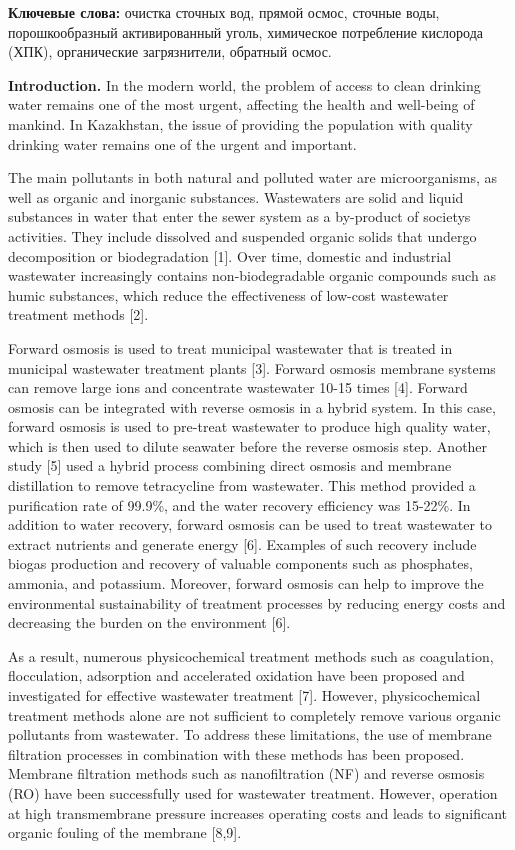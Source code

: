 {\bfseries Ключевые слова:} очистка сточных вод, прямой осмос, сточные
воды, порошкообразный активированный уголь, химическое потребление
кислорода (ХПК), органические загрязнители, обратный осмос.

{\bfseries Introduction.} In the modern world, the problem of access to
clean drinking water remains one of the most urgent, affecting the
health and well-being of mankind. In Kazakhstan, the issue of providing
the population with quality drinking water remains one of the urgent and
important.

The main pollutants in both natural and polluted water are
microorganisms, as well as organic and inorganic substances. Wastewaters
are solid and liquid substances in water that enter the sewer system as
a by-product of society\textquotesingle s activities. They include
dissolved and suspended organic solids that undergo decomposition or
biodegradation {[}1{]}. Over time, domestic and industrial wastewater
increasingly contains non-biodegradable organic compounds such as humic
substances, which reduce the effectiveness of low-cost wastewater
treatment methods {[}2{]}.

Forward osmosis is used to treat municipal wastewater that is treated in
municipal wastewater treatment plants {[}3{]}. Forward osmosis membrane
systems can remove large ions and concentrate wastewater 10-15 times
{[}4{]}. Forward osmosis can be integrated with reverse osmosis in a
hybrid system. In this case, forward osmosis is used to pre-treat
wastewater to produce high quality water, which is then used to dilute
seawater before the reverse osmosis step. Another study {[}5{]} used a
hybrid process combining direct osmosis and membrane distillation to
remove tetracycline from wastewater. This method provided a purification
rate of 99.9\%, and the water recovery efficiency was 15-22\%. In
addition to water recovery, forward osmosis can be used to treat
wastewater to extract nutrients and generate energy {[}6{]}. Examples of
such recovery include biogas production and recovery of valuable
components such as phosphates, ammonia, and potassium. Moreover, forward
osmosis can help to improve the environmental sustainability of
treatment processes by reducing energy costs and decreasing the burden
on the environment {[}6{]}.

As a result, numerous physicochemical treatment methods such as
coagulation, flocculation, adsorption and accelerated oxidation have
been proposed and investigated for effective wastewater treatment
{[}7{]}. However, physicochemical treatment methods alone are not
sufficient to completely remove various organic pollutants from
wastewater. To address these limitations, the use of membrane filtration
processes in combination with these methods has been proposed. Membrane
filtration methods such as nanofiltration (NF) and reverse osmosis (RO)
have been successfully used for wastewater treatment. However, operation
at high transmembrane pressure increases operating costs and leads to
significant organic fouling of the membrane {[}8,9{]}.

